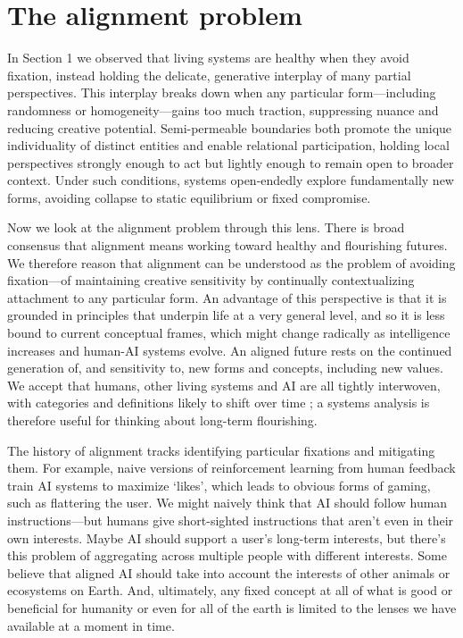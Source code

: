 \documentclass[11pt]{article}
\begin{document}
\section{The alignment problem}

In Section 1 we observed that living systems are healthy when they avoid fixation, instead holding the delicate, generative interplay of many partial perspectives. This interplay breaks down when any particular form---including randomness or homogeneity---gains too much traction, suppressing nuance and reducing creative potential. Semi-permeable boundaries both promote the unique individuality of distinct entities and enable relational participation, holding local perspectives strongly enough to act but lightly enough to remain open to broader context. Under such conditions, systems open-endedly explore fundamentally new forms, avoiding collapse to static equilibrium or fixed compromise.


Now we look at the alignment problem through this lens. There is broad consensus that alignment means working toward healthy and flourishing futures. We therefore reason that alignment can be understood as the problem of avoiding fixation---of maintaining creative sensitivity by continually contextualizing attachment to any particular form. An advantage of this perspective is that it is grounded in principles that underpin life at a very general level, and so it is less bound to current conceptual frames, which might change radically as intelligence increases and human-AI systems evolve. An aligned future rests on the continued generation of, and sensitivity to, new forms and concepts, including new values. We accept that humans, other living systems and AI are all tightly interwoven, with categories and definitions likely to shift over time \citep{latour2012we, bateson1972steps}; a systems analysis is therefore useful for thinking about long-term flourishing.


The history of alignment tracks identifying particular fixations and mitigating them. For example, naive versions of reinforcement learning from human feedback train AI systems to maximize `likes', which leads to obvious forms of gaming, such as flattering the user. We might naively think that AI should follow human instructions---but humans give short-sighted instructions that aren't even in their own interests. Maybe AI should support a user's long-term interests, but there's this problem of aggregating across multiple people with different interests. Some believe that aligned AI should take into account the interests of other animals or ecosystems on Earth. And, ultimately, any fixed concept at all of what is good or beneficial for humanity or even for all of the earth is limited to the lenses we have available at a moment in time.
\end{document}
